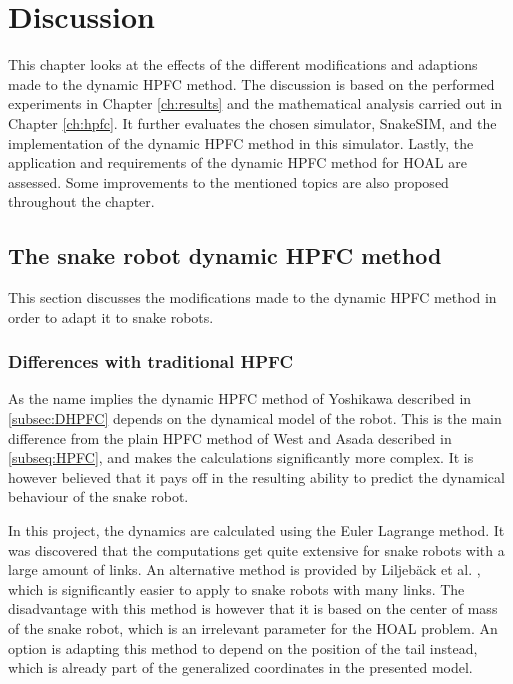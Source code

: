 \chapter{Discussion}\label{ch:discussion}

This chapter looks at the effects of the different modifications and adaptions made to the dynamic HPFC method. The discussion is based on the performed experiments in Chapter \ref{ch:results} and the mathematical analysis carried out in Chapter \ref{ch:hpfc}. It further evaluates the chosen simulator, SnakeSIM, and the implementation of the dynamic HPFC method in this simulator. Lastly, the application and requirements of the dynamic HPFC method for HOAL are assessed. Some improvements to the mentioned topics are also proposed throughout the chapter.

\section{The snake robot dynamic HPFC method}

This section discusses the modifications made to the dynamic HPFC method in order to adapt it to snake robots.

\subsection{Differences with traditional HPFC}\label{subsec:dis-diff}

As the name implies the dynamic HPFC method of Yoshikawa \cite{yoshikawa1987dynamic} described in \ref{subsec:DHPFC} depends on the dynamical model of the robot. This is the main difference from the plain HPFC method of West and Asada \cite{west1985method} described in \ref{subseq:HPFC}, and makes the calculations significantly more complex. It is however believed that it pays off in the resulting ability to predict the dynamical behaviour of the snake robot.

In this project, the dynamics are calculated using the Euler Lagrange method. It was discovered that the computations get quite extensive for snake robots with a large amount of links. An alternative method is provided by Liljebäck et al. \cite{liljeback2012snake}, which is significantly easier to apply to snake robots with many links. The disadvantage with this method is however that it is based on the center of mass of the snake robot, which is an irrelevant parameter for the HOAL problem. %
An option is adapting this method to depend on the position of the tail instead, which is already part of the generalized coordinates in the presented model.

